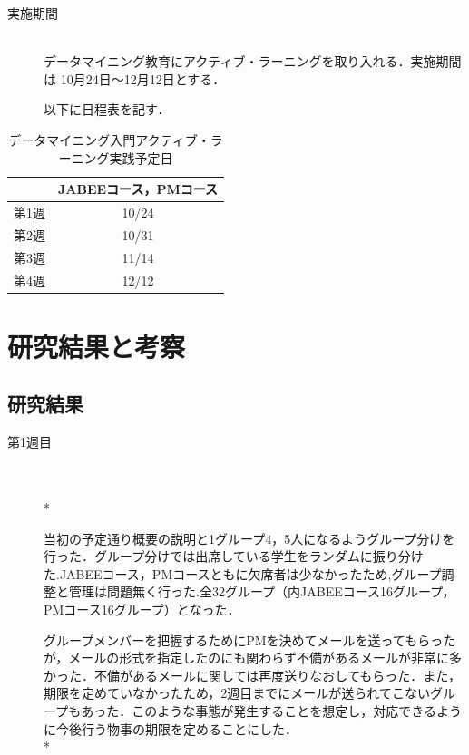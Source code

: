 \newpage


\begin{description}
 \item[実施期間]\mbox{}\\ 
	 データマイニング教育にアクティブ・ラーニングを取り入れる．実施期間は 10月24日～12月12日とする．

以下に日程表を記す．

\end{description}

\begin{table}[hbtp]
  \caption{データマイニング入門アクティブ・ラーニング実践予定日}
  \label{table:data_type}
  \centering
  \begin{tabular}{|c|c|}
    \hline
    & JABEEコース，PMコース  \\ \hline
    第1週 & 10/24 \\ \hline
    第2週 & 10/31 \\ \hline
    第3週 & 11/14 \\ \hline
    第4週 & 12/12 \\
 \hline
  \end{tabular}
\end{table}





\chapter{研究結果と考察}


\section{研究結果} 

\begin{description}
 \item[第1週目]\mbox{}\\  \vspace{0.1in} \\*

	  当初の予定通り概要の説明と1グループ4，5人になるようグループ分けを行った．グループ分けでは出席している学生をランダムに振り分けた.JABEEコース，PMコースともに欠席者は少なかったため,グループ調整と管理は問題無く行った.全32グループ（内JABEEコース16グループ，PMコース16グループ）となった．
	  
グループメンバーを把握するためにPMを決めてメールを送ってもらったが，メールの形式を指定したのにも関わらず不備があるメールが非常に多かった．不備があるメールに関しては再度送りなおしてもらった．また，期限を定めていなかったため，2週目までにメールが送られてこないグループもあった．このような事態が発生することを想定し，対応できるように今後行う物事の期限を定めることにした． \vspace{0.1in} \\*


\end{description}

